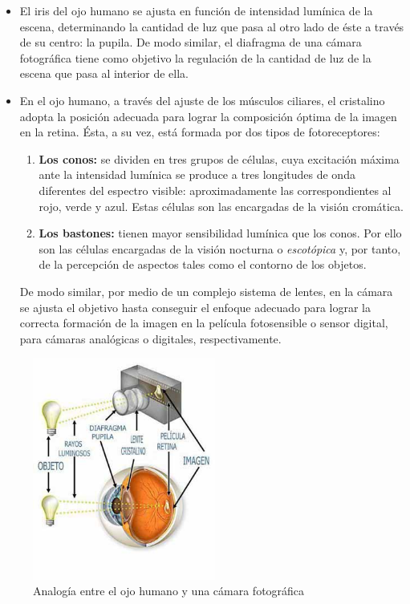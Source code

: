 \documentclass[a4paper, 12pt]{report}
\begin{document}
\begin{itemize}
    \item  El iris del ojo humano se ajusta en función de intensidad lumínica de la escena, determinando la cantidad de luz que pasa al otro lado de éste a través de su centro: la pupila. De modo similar, el diafragma de una cámara fotográfica tiene como objetivo la regulación de la cantidad de luz de la escena que pasa al interior de ella.
    \item En el ojo humano, a través del ajuste de los músculos ciliares, el cristalino adopta la posición adecuada para lograr la composición óptima de la imagen en la retina. Ésta, a su vez, está formada por dos tipos de fotoreceptores:   
        \begin{enumerate}
            \item \textbf{Los conos: } se dividen en tres grupos de células, cuya excitación máxima ante la intensidad lumínica se produce a tres longitudes de onda diferentes del espectro visible: aproximadamente las correspondientes al rojo, verde y azul.
            Estas células son las encargadas de la visión cromática.
            \item \textbf{Los bastones: }tienen mayor sensibilidad lumínica que los conos. Por ello son las células encargadas de la visión nocturna o \textit{escotópica} y, por tanto, de la percepción de aspectos tales como el contorno de los objetos.
        \end{enumerate}
        De modo similar, por medio de un complejo sistema de lentes, en la cámara se ajusta el objetivo hasta conseguir el enfoque adecuado para lograr la correcta formación de la imagen en la película fotosensible o sensor digital, para cámaras analógicas o digitales, respectivamente.
\end{itemize}

\begin{figure}[H]
    \centering
    \includegraphics[width=6cm, keepaspectratio]{img/3_Fundamentos_de_Television/3_1_Formatos_de_TV_Tradicionales/3_1_1_Colorimetria/1_camera_vs_eye.jpg}
    \caption[Analogía entre el ojo humano y una cámara fotográfica]{Analogía entre el ojo humano y una cámara fotográfica~\cite{url:_ojo_camara}}
    \label{fig:fotocamera}
\end{figure}
\end{document}
